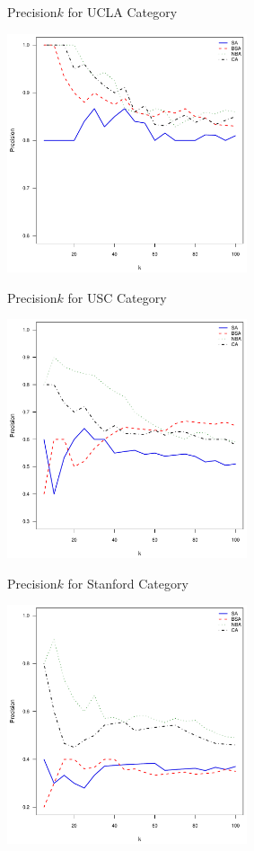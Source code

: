 \documentclass{beamer}
\begin{document}
\begin{frame}{Precision\at$k$ for UCLA Category}
\begin{center}
  \includegraphics[width=200pt]{experiment/e1_ucla.pdf}
\end{center}
\end{frame}

\begin{frame}{Precision\at$k$ for USC Category}
\begin{center}
  \includegraphics[width=200pt]{experiment/e1_usc.pdf}
\end{center}
\end{frame}

\begin{frame}{Precision\at$k$ for Stanford Category}
\begin{center}
  \includegraphics[width=200pt]{experiment/e1_stanford.pdf}
\end{center}
\end{frame}
\end{document}
